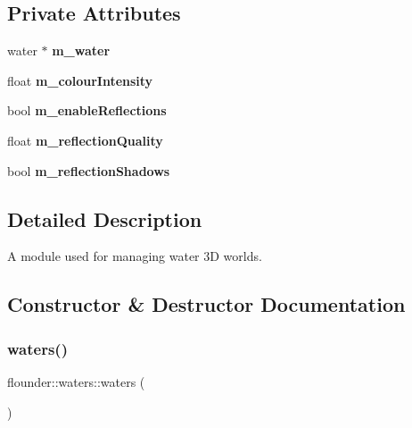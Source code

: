 \subsection*{Private Attributes}
\begin{DoxyCompactItemize}
\item 
\mbox{\label{classflounder_1_1waters_a27d30eeba2245dbb889c074b41b11c9d}} 
water $\ast$ {\bfseries m\+\_\+water}
\item 
\mbox{\label{classflounder_1_1waters_a644893dc4b5d7bad80b62fdb00961c44}} 
float {\bfseries m\+\_\+colour\+Intensity}
\item 
\mbox{\label{classflounder_1_1waters_a7a928d7ce8cb716f7f0e2e8a15c75545}} 
bool {\bfseries m\+\_\+enable\+Reflections}
\item 
\mbox{\label{classflounder_1_1waters_a0c0f65dbfbf634e63596c4c38158b12b}} 
float {\bfseries m\+\_\+reflection\+Quality}
\item 
\mbox{\label{classflounder_1_1waters_a58b72ff81e847237165d197dc9438862}} 
bool {\bfseries m\+\_\+reflection\+Shadows}
\end{DoxyCompactItemize}


\subsection{Detailed Description}
A module used for managing water 3D worlds. 



\subsection{Constructor \& Destructor Documentation}
\mbox{\label{classflounder_1_1waters_aaa8c51d2a2a197112daee1c483e1cc5f}} 
\subsubsection{\texorpdfstring{waters()}{waters()}}
{\footnotesize\ttfamily flounder\+::waters\+::waters (\begin{DoxyParamCaption}{ }\end{DoxyParamCaption})}



